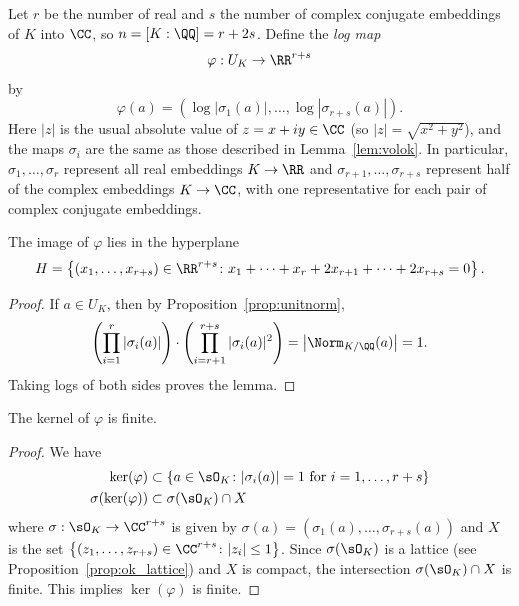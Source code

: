 Let $r$ be the number of real and $s$ the number of complex conjugate
embeddings of $K$ into $\CC$, so $n = [K:\QQ] = r + 2s$.
Define the {\em log map}
\[
  \varphi:U_K \to \RR^{r+s}
\]
by
\[
  \varphi(a) = \left(
    \log\left|\sigma_1(a)\right|, \dots, \log\left|\sigma_{r+s}(a)\right|
  \right).
\]
Here $|z|$ is the usual absolute value of $z=x+iy \in \CC$
(so $|z|=\sqrt{x^2+y^2}$), and the maps $\sigma_i$ are
the same as those described in Lemma~\ref{lem:volok}.
In particular,
$\sigma_1,\dots,\sigma_r$ represent all real embeddings
$K\to\RR$ and $\sigma_{r+1},\dots,\sigma_{r+s}$ represent
half of the complex embeddings $K \to \CC$, with one representative
for each pair of complex conjugate embeddings.

\begin{lemma}\label{lem:inh}
  The image of $\varphi$ lies in the hyperplane
  \begin{equation}\label{eqn:hyperplane}
    H = \left\{ (x_1,\dots, x_{r+s}) \in \RR^{r+s} \colon
    x_1+ \cdots + x_r + 2x_{r+1} + \cdots + 2x_{r+s} = 0 \right\}.
  \end{equation}
\end{lemma}
\begin{proof}
  If $a\in U_K$, then by Proposition~\ref{prop:unitnorm},
  \[
    \left(\prod_{i=1}^{r} |\sigma_i(a)|\right)
    \cdot \left( \prod_{i=r+1}^{r+s} |\sigma_i(a)|^2 \right)
    = \left|\Norm_{K/\QQ}(a)\right|
    = 1.
  \]
  Taking logs of both sides proves the lemma.
\end{proof}

\begin{lemma}\label{lem:vphifinitekernel}
  The kernel of $\varphi$ is finite.
\end{lemma}
\begin{proof}
  We have
  \begin{align*}
    \ker(\varphi) &\subset \left\{a\in\sO_K \colon |\sigma_i(a)|
    = 1 \text{ for }i=1,\dots,r+s\right\} \\
    \sigma(\ker(\varphi)) &\subset \sigma(\sO_K) \cap X
  \end{align*}
  where $\sigma:\sO_K \to \CC^{r+s}$ is given by
  $\sigma(a) = \left(\sigma_1(a),\dots,\sigma_{r+s}(a)\right)$ and
  $X$ is the set $\left\{(z_1,\dots,z_{r+s}) \in \CC^{r+s} \colon |z_i|\leq 1\right\}$.
  Since $\sigma(\sO_K)$ is a lattice (see Proposition~\ref{prop:ok_lattice}) and $X$
  is compact, the intersection $\sigma(\sO_K)\cap X$ is finite.
  This implies $\ker(\varphi)$ is finite.
\end{proof}

